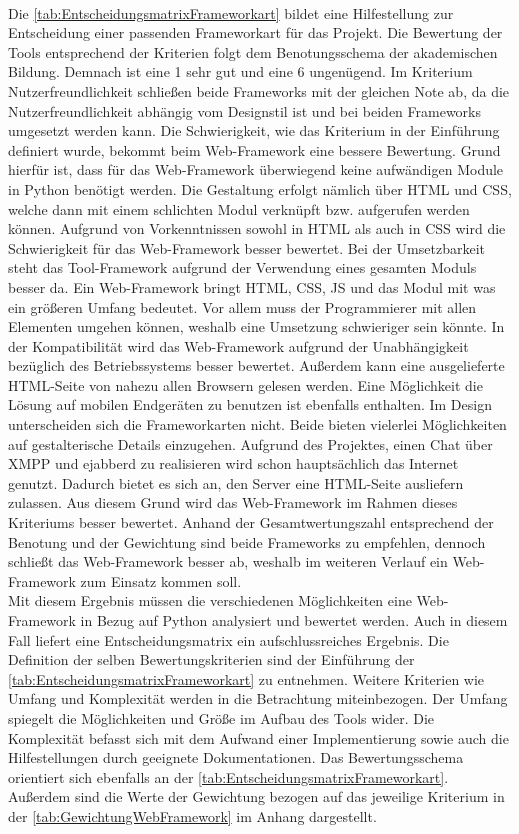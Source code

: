 \documentclass[a4paper,titlepage,halfparskip,12pt]{scrreprt}
\begin{document}
\begin{onehalfspacing}
\begin{table}[h]
\end{table} \\
Die \autoref{tab:EntscheidungsmatrixFrameworkart} bildet eine Hilfestellung zur Entscheidung einer passenden Frameworkart für das Projekt. Die Bewertung der Tools entsprechend der Kriterien folgt dem Benotungsschema der akademischen Bildung. Demnach ist eine 1 sehr gut und eine 6 ungenügend. Im Kriterium Nutzerfreundlichkeit schließen beide Frameworks mit der gleichen Note ab, da die Nutzerfreundlichkeit abhängig vom Designstil ist und bei beiden Frameworks umgesetzt werden kann. Die Schwierigkeit, wie das Kriterium in der Einführung definiert wurde, bekommt beim Web-Framework eine bessere Bewertung. Grund hierfür ist, dass für das Web-Framework überwiegend keine aufwändigen Module in Python benötigt werden. Die Gestaltung erfolgt nämlich über \ac{HTML} und \ac{CSS}, welche dann mit einem schlichten Modul verknüpft bzw. aufgerufen werden können. Aufgrund von Vorkenntnissen sowohl in \ac{HTML} als auch in \ac{CSS} wird die Schwierigkeit für das Web-Framework besser bewertet. Bei der Umsetzbarkeit steht das Tool-Framework aufgrund der Verwendung eines gesamten Moduls besser da. Ein Web-Framework bringt \ac{HTML}, \ac{CSS}, \ac{JS} und das Modul mit was ein größeren Umfang bedeutet. Vor allem muss der Programmierer mit allen Elementen umgehen können, weshalb eine Umsetzung schwieriger sein könnte. In der Kompatibilität wird das Web-Framework aufgrund der Unabhängigkeit bezüglich des Betriebssystems besser bewertet. Außerdem kann eine ausgelieferte \ac{HTML}-Seite von nahezu allen Browsern gelesen werden. Eine Möglichkeit die Lösung auf mobilen Endgeräten zu benutzen ist ebenfalls enthalten. Im Design unterscheiden sich die Frameworkarten nicht. Beide bieten vielerlei Möglichkeiten auf gestalterische Details einzugehen. Aufgrund des Projektes, einen Chat über \ac{XMPP} und ejabberd zu realisieren wird schon hauptsächlich das Internet genutzt. Dadurch bietet es sich an, den Server eine \ac{HTML}-Seite ausliefern zulassen. Aus diesem Grund wird das Web-Framework im Rahmen dieses Kriteriums besser bewertet. Anhand der Gesamtwertungszahl entsprechend der Benotung und der Gewichtung sind beide Frameworks zu empfehlen, dennoch schließt das Web-Framework besser ab, weshalb im weiteren Verlauf ein Web-Framework zum Einsatz kommen soll. \cite{FrameworkOverview} \cite{WebFramework}\\ 
Mit diesem Ergebnis müssen die verschiedenen Möglichkeiten eine Web-Framework in Bezug auf Python analysiert und bewertet werden. Auch in diesem Fall liefert eine Entscheidungsmatrix ein aufschlussreiches Ergebnis. Die Definition der selben Bewertungskriterien sind der Einführung der \autoref{tab:EntscheidungsmatrixFrameworkart} zu entnehmen. Weitere Kriterien wie Umfang und Komplexität werden in die Betrachtung miteinbezogen. Der Umfang spiegelt die Möglichkeiten und Größe im Aufbau des Tools wider. Die Komplexität befasst sich mit dem Aufwand einer Implementierung sowie auch die Hilfestellungen durch geeignete Dokumentationen. Das Bewertungsschema orientiert sich ebenfalls an der \autoref{tab:EntscheidungsmatrixFrameworkart}. Außerdem sind die Werte der Gewichtung bezogen auf das jeweilige Kriterium in der \autoref{tab:GewichtungWebFramework} im Anhang dargestellt.

\end{onehalfspacing}
\end{document}
